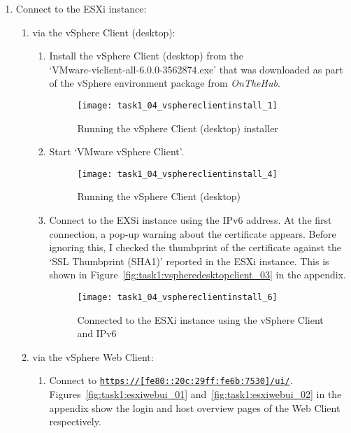 \begin{enumerate}[resume*=task1methodology]
  \item Connect to the ESXi instance:
    \begin{enumerate}[label=(\alph*)]
      \item via the vSphere Client (desktop):
        \begin{enumerate}[label=\roman*.]
          \item Install the vSphere Client (desktop) from the\\`VMware-viclient-all-6.0.0-3562874.exe' that was downloaded as part of the vSphere environment package from \textit{OnTheHub\textsuperscript{\textregistered}}.
            \begin{figure}[H]
              \centering
              \captionsetup{skip=2pt}
              \texttt{[image: task1\_04\_vsphereclientinstall\_1]}
              \caption{Running the vSphere Client (desktop) installer}
              \label{fig:task1:vspheredesktopclient_01}
            \end{figure}
          \item Start `VMware vSphere Client'.
            \begin{figure}[H]
              \centering
              \captionsetup{skip=2pt}
              \texttt{[image: task1\_04\_vsphereclientinstall\_4]}
              \caption{Running the vSphere Client (desktop)}
              \label{fig:task1:vspheredesktopclient_02}
            \end{figure}
          \item Connect to the EXSi instance using the IPv6 address. At the first connection, a pop-up warning about the certificate appears. Before ignoring this, I checked the thumbprint of the certificate against the `SSL Thumbprint (SHA1)' reported in the ESXi instance. This is shown in Figure~\ref{fig:task1:vspheredesktopclient_03} in the  appendix.
            \begin{figure}[H]
              \centering
              \captionsetup{skip=2pt}
              \texttt{[image: task1\_04\_vsphereclientinstall\_6]}
              \caption{Connected to the ESXi instance using the vSphere Client and IPv6}
              \label{fig:task1:vspheredesktopclient_04}
            \end{figure}
        \end{enumerate}
      \item via the vSphere Web Client:
        \begin{enumerate}[label=\roman*.]
          \item Connect to \texttt{\url{https://[fe80::20c:29ff:fe6b:7530]/ui/}}. Figures~\ref{fig:task1:esxiwebui_01} and~\ref{fig:task1:esxiwebui_02} in the  appendix show the login and host overview pages of the Web Client respectively.
        \end{enumerate}
    \end{enumerate}
\end{enumerate}

